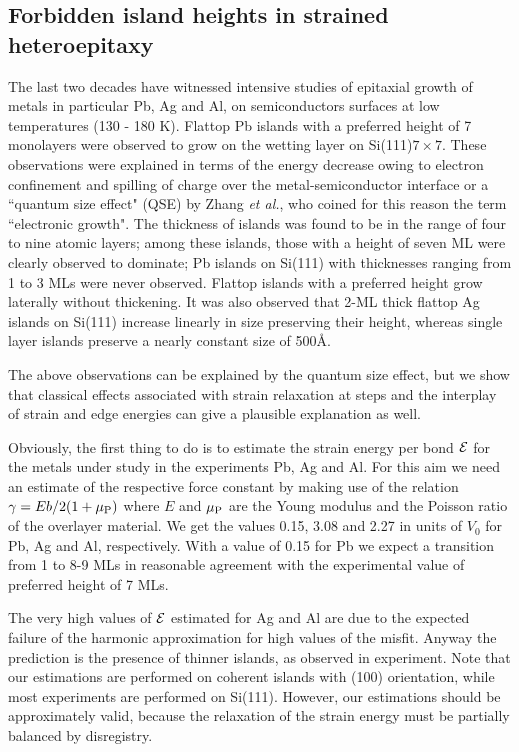 \documentclass[aps,prl,showpacs,twocolumn,byrevtex,floatfix]{revtex4-1}
\begin{document}
\subsection{Forbidden island heights in strained heteroepitaxy}

The last two decades have witnessed intensive studies of epitaxial growth of
metals in particular Pb, Ag and Al, on semiconductors surfaces at low
temperatures (130 - 180 K).\cite{Gavioli99,Hupalo01,Su01,Floreano03} Flattop Pb
islands with a preferred height of 7 monolayers were observed to grow on the
wetting layer on Si(111)$7\times 7$.\cite{Gavioli99,Hupalo01,Su01,Yeh00} These
observations were explained in terms of the energy decrease owing to electron
confinement and spilling of charge over the metal-semiconductor interface or a
``quantum size effect" (QSE) by Zhang {\it et al.}, who coined for this reason
the term ``electronic growth".\cite{Zhang98} The thickness of islands was found 
to be in the
range of four to nine atomic layers; among these islands, those with a height
of seven ML were clearly observed to dominate; Pb islands on Si(111) with
thicknesses ranging from 1 to 3 MLs were never
observed.\cite{Su01,Chang02,Ozer05} Flattop islands with a preferred height grow
laterally without thickening.\cite{Gavioli99,Ozer05,Budde00} It was also
observed that 2-ML thick flattop Ag islands on Si(111) increase linearly in
size preserving their height,\cite{Gavioli99} whereas single layer islands
preserve a nearly constant size of 500\AA.\cite{Su05}

The above observations can be explained by the quantum size effect, but we show
that classical effects associated with strain relaxation at steps and the
interplay of strain and edge energies can give a plausible explanation as
well.\cite{Prieto07}

Obviously, the first thing to do is to estimate the strain energy per bond
${\cal E}$ for the metals under study in the experiments Pb, Ag and Al. For this
aim we need an estimate of the respective force constant by making use of the
relation $\gamma = Eb/2(1+\mu_{\rm P})$ where $E$ and $\mu_{\rm P}$ are the
Young modulus and the Poisson ratio of the overlayer material. We get the values
0.15, 3.08 and 2.27 in units of $V_0$ for Pb, Ag and Al, respectively. With a 
value of 0.15 for Pb we expect a transition from 1 to 8-9 MLs in reasonable
agreement with the experimental value of preferred height of 7
MLs.\cite{Gavioli99,Hupalo01,Su01,Yeh00,Chang02,Ozer05,Su05}

The very high values of ${\cal E}$ estimated for Ag and Al are due to the 
expected failure of the harmonic approximation for high values of the misfit.
Anyway the prediction is the presence of thinner islands, as observed in
experiment.\cite{Su05,Liu04} Note that our estimations are performed on coherent
islands with (100) orientation, while most experiments are performed on Si(111).
However, our estimations should be approximately valid, because the relaxation
of the strain energy must be partially balanced by disregistry.
\end{document}
